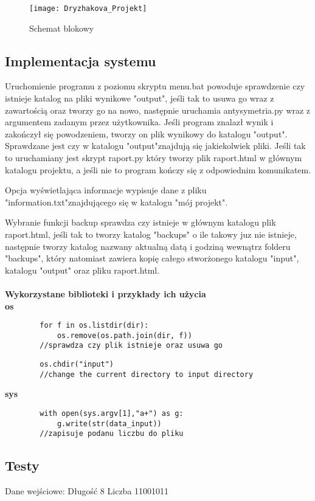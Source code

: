 \documentclass[12pt,a4paper]{article}
\begin{document}
	\begin{figure}[htp]
    \centering
    \texttt{[image: Dryzhakova\_Projekt]}
    \caption{Schemat blokowy}
\end{figure}
	

	\subsection*{Implementacja systemu}
	Uruchomienie programu z poziomu skryptu menu.bat powoduje sprawdzenie czy istnieje katalog na pliki wynikowe "output", jeśli tak to usuwa go wraz z zawartością oraz tworzy go
na nowo, następnie uruchamia antysymetria.py wraz z argumentem zadanym przez użytkownika. Jeśli program znalazł wynik i zakończył się powodzeniem, tworzy on
plik wynikowy do katalogu "output". Sprawdzane jest czy w katalogu "output"znajdują się jakiekolwiek pliki. Jeśli tak to uruchamiany jest skrypt raport.py który tworzy plik raport.html w głównym katalogu projektu, a jeśli nie to program kończy się z odpowiednim komunikatem.

Opcja wyświetlająca informacje wypisuje dane z pliku "information.txt"znajdującego się w katalogu "mój projekt".

Wybranie funkcji backup sprawdza czy istnieje w głównym katalogu plik raport.html, jeśli tak to tworzy katalog "backups" o ile takowy juz nie istnieje, następnie tworzy katalog nazwany aktualną datą i godziną wewnątrz folderu "backups", który natomiast zawiera kopię całego stworżonego
katalogu "input", katalogu "output" oraz pliku raport.html.\\\\

\textbf{Wykorzystane biblioteki i przykłady ich użycia}\\
\textbf{os}
	\begin{lstlisting}
		for f in os.listdir(dir):
   			os.remove(os.path.join(dir, f))
   		//sprawdza czy plik istnieje oraz usuwa go
	\end{lstlisting}
	\begin{lstlisting}
		os.chdir("input")
		//change the current directory to input directory
	\end{lstlisting}
\textbf{sys}
\begin{lstlisting}
		with open(sys.argv[1],"a+") as g:
    		g.write(str(data_input))
    	//zapisuje podanu liczbu do pliku
	\end{lstlisting}
	\subsection*{Testy}
Dane wejściowe:
Długość 8
Liczba 11001011
\end{document}
